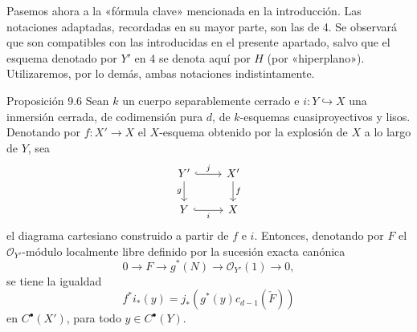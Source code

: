 Pasemos ahora a la «fórmula clave» mencionada en la introducción. Las notaciones adaptadas, recordadas en su mayor parte, son las de 4. Se observará que son compatibles con las introducidas en el presente apartado, salvo que el esquema denotado por $Y'$ en 4 se denota aquí por $H$ (por «hiperplano»). Utilizaremos, por lo demás, ambas notaciones indistintamente.

\begin{statement}{Proposición 9.6}
Sean $k$ un cuerpo separablemente cerrado e $i:Y\hookrightarrow X$ una inmersión cerrada, de codimensión pura $d$, de $k$-esquemas cuasiproyectivos y lisos. Denotando por $f:X'\to X$ el $X$-esquema obtenido por la explosión de $X$ a lo largo de $Y$, sea
\[
\begin{tikzcd}
Y'\arrow[r,hook,"j"]\arrow[d,"g"']&X'\arrow[d,"f"]\\
Y\arrow[r,hook,"i"']&X
\end{tikzcd}
\]
el diagrama cartesiano construido a partir de $f$ e $i$. Entonces, denotando por $F$ el $\mathcal O_{Y'}$-módulo localmente libre definido por la sucesión exacta canónica
\[
0\to F\to g^*(N)\to\mathcal O_{Y'}(1)\to0,
\tag{9.6.1}
\]
se tiene la igualdad
\[
f^*i_*(y)=j_*(g^*(y)c_{d-1}(\check F))
\tag{9.6.2}
\]
en $C^{\bullet}(X')$, para todo $y\in C^{\bullet}(Y)$.
\end{statement}
